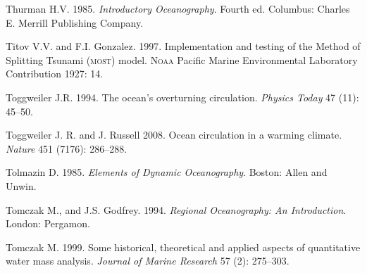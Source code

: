 \begin{thebibliography}{999}
Thurman H.V.  1985. \textit{Introductory Oceanography}. Fourth
ed. Columbus: Charles E. Merrill Publishing Company.
%

Titov V.V. and F.I. Gonzalez.  1997. Implementation and testing of the
Method of Splitting Tsunami (\textsc{most}) model. \textsc{Noaa}
Pacific Marine Environmental Laboratory Contribution 1927: 14.
%

Toggweiler J.R.  1994. The ocean's overturning
circulation. \textit{Physics Today} 47 (11): 45--50.
%

Toggweiler J. R. and J. Russell 2008. Ocean circulation in a warming
climate. \textit{Nature} 451 (7176): 286--288.
%

Tolmazin D.  1985. \textit{Elements of Dynamic Oceanography}. Boston:
Allen and Unwin.
%

Tomczak M., and J.S. Godfrey.  1994. \textit{Regional Oceanography: An
  Introduction}. London: Pergamon.
%

Tomczak M.  1999. Some historical, theoretical and applied aspects of
quantitative water mass analysis. \textit{Journal of Marine Research}
57 (2): 275--303.
%


\end{thebibliography}
